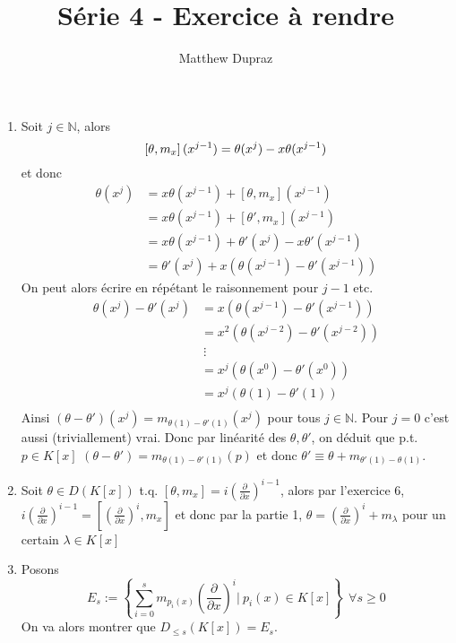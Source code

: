 \documentclass[french]{article}
\title{Série 4 - Exercice à rendre}
\author{Matthew Dupraz}
\newcommand{\mdx}[1]{\left(\frac{\partial}{\partial x}\right)^{#1}}
\newcommand{\DK}[1]{D_{\leq #1} (K[x])}
\newcommand{\N}{\mathbb{N}}
\newcommand{\lie}[2]{\left[#1, #2\right]}
\begin{document}
\maketitle

\begin{enumerate}
	\item Soit $j \in \N$, alors
		\begin{equation*}
			\lie{\theta}{m_x}(x^{j-1}) = \theta(x^j) - x\theta(x^{j-1})\\
		\end{equation*}
		et donc
		\begin{align*}
			\theta(x^j) &= x\theta(x^{j-1}) + \lie{\theta}{m_x}(x^{j-1})\\
			&= x\theta(x^{j-1}) + \lie{\theta'}{m_x}(x^{j-1})\\
			&= x\theta(x^{j-1}) + \theta'(x^j) - x\theta'(x^{j - 1})\\
			&= \theta'(x^j) + x(\theta(x^{j-1}) - \theta'(x^{j-1}))
		\end{align*}
		On peut alors écrire en répétant le raisonnement pour $j-1$ etc.
		\begin{align*}
			\theta(x^j) - \theta'(x^j)
			&= x(\theta(x^{j-1}) - \theta'(x^{j-1}))\\
			&= x^2(\theta(x^{j-2}) - \theta'(x^{j-2}))\\
			&~\vdots\\
			&= x^j(\theta(x^0) - \theta'(x^0))\\
			&= x^j(\theta(1) - \theta'(1))\\
		\end{align*}
		Ainsi $(\theta - \theta')(x^j) = m_{\theta(1) - \theta'(1)}(x^j)$ pour
		tous $j \in \N$. Pour $j = 0$ c'est aussi (triviallement) vrai.
		Donc par linéarité des $\theta, \theta'$, on déduit que p.t. $p\in K[x]$
		$(\theta - \theta') = m_{\theta(1) - \theta'(1)}(p)$ et donc
		$\theta' \equiv \theta +  m_{\theta'(1) - \theta(1)}$.
	\item Soit $\theta \in D(K[x])$ t.q. $\lie{\theta}{m_x} = i\mdx{i-1}$,
		alors par l'exercice 6, $i\mdx{i-1} = \lie{\mdx{i}}{m_x}$ et donc par
		la partie 1, $\theta = \mdx{i} + m_\lambda$ pour un certain $\lambda \in
		K[x]$
	\item
		Posons
		\begin{equation*}
			E_s := \left\{\sum_{i=0}^s m_{p_i(x)}\mdx{i} \Big|~p_i(x) \in
			K[x]\right\}~~\forall s \geq 0
		\end{equation*}
		On va alors montrer que $\DK{s} = E_s$.
		

\end{enumerate}
\end{document}
